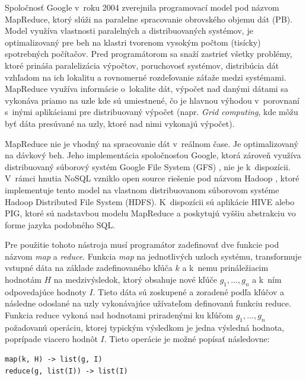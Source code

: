 \documentclass[11pt,twoside,a4paper]{book}
\begin{document}
Spoločnosť Google v~roku 2004 zverejnila programovací model pod názvom MapReduce, ktorý slúži na paralelne spracovanie obrovského objemu dát (PB). Model využíva vlastnosti paralelných a distribuovaných systémov, je optimalizovaný pre beh na klastri tvorenom vysokým počtom (tisícky) spotrebných počítačov. Pred programátorom sa snaží zastrieť všetky problémy, ktoré prináša paralelizácia výpočtov, poruchovosť systémov, distribúcia dát vzhľadom na ich lokalitu a rovnomerné rozdeľovanie záťaže medzi systémami. MapReduce využíva informácie o~lokalite dát, výpočet nad danými dátami sa vykonáva priamo na uzle kde sú umiestnené, čo je hlavnou výhodou v~porovnaní s~inými aplikáciami pre distribuovaný výpočet (napr. \emph{Grid computing}, kde môžu byť dáta presúvané na uzly, ktoré nad nimi vykonajú výpočet).

MapReduce nie je vhodný na spracovanie dát v~reálnom čase. Je optimalizovaný na dávkový beh. Jeho implementácia spoločnosťou Google, ktorá zároveň využíva distribuovaný súborový systém Google File System (GFS) \cite{ghemawat2003google}, nie je k~dispozícii. V~rámci hnutia NoSQL vzniklo open source riešenie pod názvom Hadoop \cite{hadoopW}, ktoré implementuje tento model na vlastnom distribuovanom súborovom systéme Hadoop Distributed File System (HDFS). K~dispozícii sú aplikácie HIVE alebo PIG, ktoré sú nadstavbou modelu MapReduce a poskytujú vyššiu abstrakciu vo forme jazyka podobného SQL.


Pre použitie tohoto nástroja musí programátor zadefinovať dve funkcie pod názvom \emph{map} a \emph{reduce}. Funkcia \emph{map} na jednotlivých uzloch systému, transformuje vstupné dáta na základe zadefinovaného kľúča $k$ a k~nemu prináležiacim hodnotám $H$ na medzivýsledok, ktorý obsahuje nové kľúče $g_1,...,g_n$ a k~ním odpovedajúce hodnoty $I$. Tieto dáta sú zoskupené a zoradené podľa kľúčov a následne odoslané na uzly vykonávajúce užívateľom definovanú funkciu reduce. Funkcia reduce vykoná nad hodnotami priradenými ku kľúčom $g_1,...,g_n$ požadovanú operáciu, ktorej typickým výsledkom je jedna výsledná hodnota, poprípade viacero hodnôt $I$. Tieto operácie je možné popísať následovne:

\begin{verbatim}
map(k, H) -> list(g, I)
reduce(g, list(I)) -> list(I)
\end{verbatim}
\end{document}
